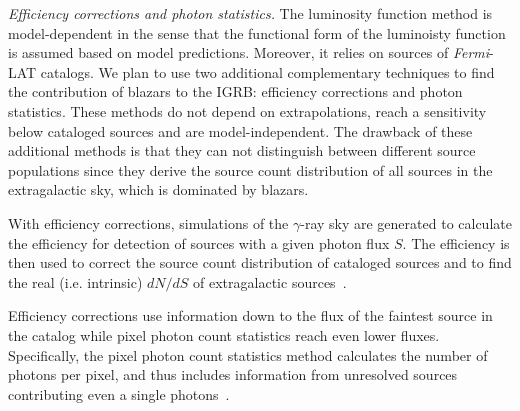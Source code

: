 \documentclass[12 pt]{article}
\begin{document}


{\it Efficiency corrections and photon statistics.}
The luminosity function method is model-dependent in the sense that the functional form of the luminoisty function is assumed based on model predictions.
Moreover, it relies on sources of {\it Fermi}-LAT catalogs.   We plan to use two additional complementary techniques to find the contribution of blazars to the IGRB: efficiency corrections and photon statistics.
These methods do not depend on extrapolations, reach a sensitivity below cataloged sources and are model-independent.
The drawback of these additional methods is that they can not distinguish between different source populations since they derive the source count distribution of all sources in the extragalactic sky, which is dominated by blazars.

With efficiency corrections, simulations of the $\gamma$-ray sky are generated to calculate the efficiency for detection of sources with a given photon flux $S$. 
The efficiency is then used to correct the source count distribution of cataloged sources and to find the real (i.e. intrinsic) $dN/dS$ of extragalactic sources~\cite{TheFermi-LAT:2015ykq}.


Efficiency corrections use information down to the flux of the faintest source in the catalog while pixel photon count statistics reach even lower fluxes.
Specifically, the pixel photon count statistics method calculates the number of photons per pixel, and thus includes information from unresolved sources contributing even a single photons~\cite{TheFermi-LAT:2015ykq}.
\end{document}
